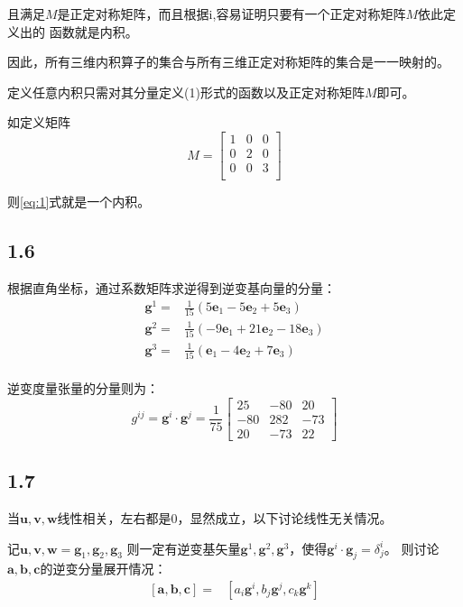 \documentclass[UTF8,zihao=5]{ctexart}
\newcommand{\bm}[1]{{\mathbf{#1}}}
\begin{document}
且满足$M$是正定对称矩阵，而且根据i,容易证明只要有一个正定对称矩阵$M$依此定义出的
函数就是内积。

因此，所有三维内积算子的集合与所有三维正定对称矩阵的集合是一一映射的。

定义任意内积只需对其分量定义(1)形式的函数以及正定对称矩阵$M$即可。

如定义矩阵
$$
M=\begin{bmatrix}
    1&0&0\\
    0&2&0\\
    0&0&3\\
\end{bmatrix}
$$

则\eqref{eq:1}式就是一个内积。

\subsection*{1.6}
根据直角坐标，通过系数矩阵求逆得到逆变基向量的分量：
\begin{equation*}
    \begin{aligned}
        \bm{g}^1=&\frac{1}{15}(5\bm{e}_1-5\bm{e}_2+5\bm{e}_3)\\
        \bm{g}^2=&\frac{1}{15}(-9\bm{e}_1+21\bm{e}_2-18\bm{e}_3)\\
        \bm{g}^3=&\frac{1}{15}(\bm{e}_1-4\bm{e}_2+7\bm{e}_3)\\
    \end{aligned}
\end{equation*}

逆变度量张量的分量则为：
\begin{equation*}
    g^{ij}=\bm{g}^i\cdot\bm{g}^j=\frac{1}{75}\begin{bmatrix}
        25 & -80 & 20\\
        -80 & 282 & -73 \\
        20 & -73 & 22
    \end{bmatrix}
\end{equation*}



\subsection*{1.7}

当$\bm{u},\bm{v},\bm{w}$线性相关，左右都是0，显然成立，以下讨论线性无关情况。

记$\bm{u},\bm{v},\bm{w}=\bm{g}_1, \bm{g}_2, \bm{g}_3$
则一定有逆变基矢量$\bm{g}^1, \bm{g}^2, \bm{g}^3$，使得$\bm{g}^i\cdot\bm{g}_j=\delta^i_j$。
则讨论$\bm{a},\bm{b},\bm{c}$的逆变分量展开情况：
\begin{equation*}
    \begin{aligned}
        [\bm{a},\bm{b},\bm{c}]
        =&[a_i\bm{g}^i,b_j\bm{g}^j,c_k\bm{g}^k]\\
    \end{aligned}
\end{equation*}
\end{document}
